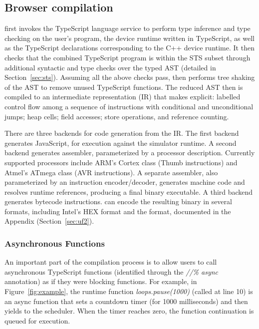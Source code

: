\subsection{Browser compilation}

\MC first invokes the TypeScript language service to perform type inference and type checking on the 
user's program, the device runtime written in TypeScript, as well as the TypeScript declarations
corresponding to the C++ device runtime. It then checks that the
combined TypeScript program is within the STS subset through additional syntactic and type checks over the typed AST (detailed in Section~\ref{sec:sts}).  Assuming all the
above checks pass, \MC then performs tree shaking of the AST to remove unused TypeScript functions.
The reduced AST then is compiled to an intermediate representation (IR) that makes explicit: labelled control
flow among a sequence of instructions with conditional and unconditional jumps; heap cells; field accesses; store operations,
and reference counting.


There are three backends for code generation from the IR. The first backend generates JavaScript,
for execution against the simulator runtime.  A second backend generates assembler, parameterized by a
processor description.  Currently supported processors include ARM's Cortex class (Thumb instructions)
and Atmel's ATmega class (AVR instructions). A separate assembler, also parameterized by an instruction
encoder/decoder, generates machine code and resolves runtime references, producing a final binary executable. A third backend generates bytecode instructions.
\MC can encode the resulting binary in several formats, 
including Intel's HEX format and the \UF format, documented in the Appendix (Section~\ref{sec:uf2}).

\subsubsection{Asynchronous Functions}

An important part of the compilation process is to allow users to call asynchronous
TypeScript functions (identified through the \emph{//\% async} annotation)
as if they were blocking functions.  For example, in Figure~\ref{fig:example}, the runtime
function \emph{loops.pause(1000)} (called at line 10)
is an async function that sets a countdown timer (for 1000 milliseconds)
and then yields to the scheduler. When the timer
reaches zero, the function continuation is queued for execution.

